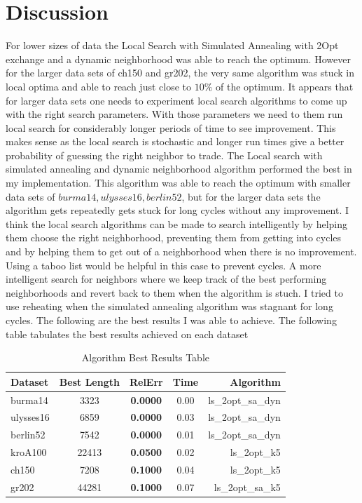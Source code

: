 \documentclass[twoside,11pt]{article}
\begin{document}
\section{Discussion}
For lower sizes of data the Local Search with Simulated Annealing with 2Opt exchange and a dynamic neighborhood was able to reach the optimum. However for the larger data sets of ch150 and gr202, the very same algorithm was stuck in local optima and able to reach just close to $10\%$ of the optimum. It appears that for larger data sets one needs to experiment local search algorithms to come up with the right search parameters. With those parameters we need to them run local search for considerably longer periods of time to see improvement. This makes sense as the local search is stochastic and longer run times give a better probability of guessing the right neighbor to trade. The Local search with simulated annealing and dynamic neighborhood algorithm performed the best in my implementation. This algorithm was able to reach the optimum with smaller data sets of $burma14,ulysses16,berlin52$, but for the larger data sets the algorithm gets repeatedly gets stuck for long cycles without any improvement.
I think the local search algorithms can be made to search intelligently by helping them choose the right neighborhood, preventing them from getting into cycles and by helping them to get out of a neighborhood when there is no improvement. Using a taboo list would be helpful in this case to prevent cycles. A more intelligent search for neighbors where we keep track of the best performing neighborhoods and revert back to them when the algorithm is stuch. I tried to use reheating when the simulated annealing algorithm was stagnant for long cycles. The following are the best results I was able to achieve. 
The following table tabulates the best results achieved on each dataset
\begin{table}[!htbp]
\centering
\caption{Algorithm Best Results Table}
\tabcolsep=0.11cm
\begin{tabular}{lcccr}
\hline
Dataset    & Best Length & RelErr & Time & Algorithm \\
\hline
burma14      & 3323    & \bf 0.0000 & 0.00 &  ls\_2opt\_sa\_dyn     \\
ulysses16    & 6859    & \bf 0.0000 & 0.03 &  ls\_2opt\_sa\_dyn     \\
berlin52     & 7542    & \bf 0.0000 & 0.01 &  ls\_2opt\_sa\_dyn     \\
kroA100     & 22413    & \bf 0.0500 & 0.02 &  ls\_2opt\_k5     \\
ch150     & 7208    & \bf 0.1000 & 0.04 &  ls\_2opt\_k5     \\
gr202     & 44281    & \bf 0.1000 & 0.07 &  ls\_2opt\_sa\_k5     \\
\hline
\end{tabular}
\end{table}
\end{document}
